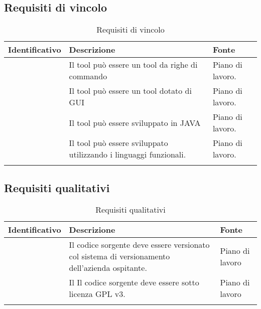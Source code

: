\subsection{Requisiti di vincolo}\label{subsec:requisiti-vincolo}
\begin{center}
    \begin{longtable}{ | c| C{7cm} |C{3cm} |}
        \hline
        \textbf{Identificativo} & \textbf{Descrizione} &\textbf{Fonte}\\\hline
         &Il tool può essere un tool da righe di commando & Piano di lavoro.\\\hline
         &Il tool può essere un tool dotato di GUI & Piano di lavoro.\\\hline
         &Il tool può essere sviluppato in JAVA & Piano di lavoro.\\\hline
         &Il tool può essere sviluppato utilizzando i linguaggi funzionali.& Piano di lavoro.\\\hline
        \caption{Requisiti di vincolo}
    \end{longtable}
\end{center}
\setcounter{rowcount}{0}

\subsection{Requisiti qualitativi}\label{subsec:requisiti-qualitativi}
\begin{center}
    \begin{longtable}{ | c| C{7cm} |C{3cm} |}
        \hline
        \textbf{Identificativo} & \textbf{Descrizione} &\textbf{Fonte}\\\hline
        &Il codice sorgente deve essere versionato col sistema di versionamento dell'azienda ospitante. &Piano di lavoro \\\hline
        &Il Il codice sorgente deve essere sotto licenza GPL v3.& Piano di lavoro\\\hline
        \caption{Requisiti qualitativi}
    \end{longtable}
\end{center}
\setcounter{subCount}{0}
\setcounter{rowcount}{0}